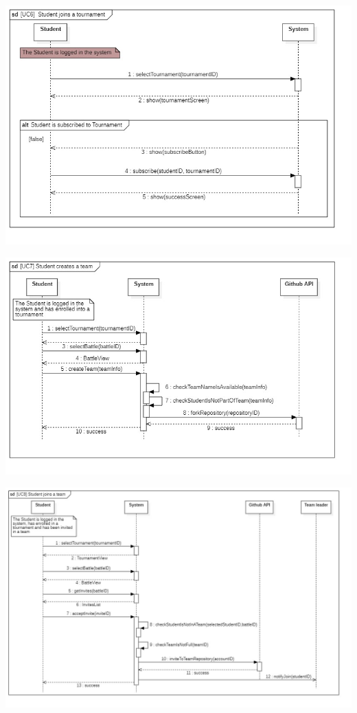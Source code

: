\documentclass{article}
\begin{document}
\begin{center}
    \includegraphics[width=\linewidth]{uc6.jpg}
  \label{fig:uc6}
\end{center}
\begin{center}
    \includegraphics[width=\linewidth]{uc7.jpg}
  \label{fig:uc7}
\end{center}

\begin{center}
    \includegraphics[width=\linewidth]{uc8.jpg}
  \label{fig:uc8}
\end{center}
\end{document}
